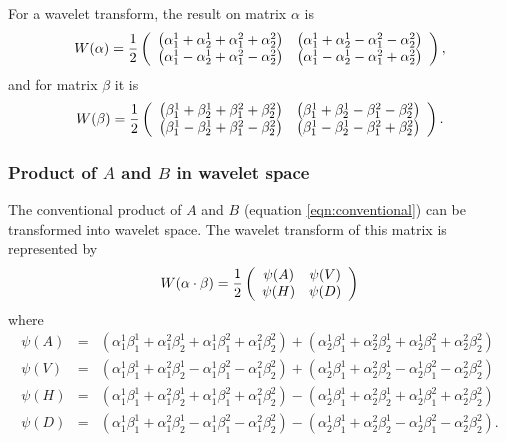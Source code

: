 For a wavelet transform, the result on matrix $\alpha$ is
\begin{equation} \label{WA} \displaystyle
W(\alpha) = 
{1 \over 2} 
\left(\begin{array}{cc}  
\left(\alpha^1_1 + \alpha^1_2 + \alpha^2_1 + \alpha^2_2\right) & 
\left(\alpha^1_1 + \alpha^1_2 - \alpha^2_1 - \alpha^2_2\right)  \\ 
\left(\alpha^1_1 - \alpha^1_2 + \alpha^2_1 - \alpha^2_2\right) & 
\left(\alpha^1_1 - \alpha^1_2 - \alpha^2_1 + \alpha^2_2\right)   
\end{array}\right), 
\end{equation}
and for matrix $\beta$ it is
\begin{equation} \label{WB} \displaystyle
W(\beta) = {1 \over 2} 
\left(\begin{array}{cc}
\left(\beta^1_1 + \beta^1_2 + \beta^2_1 + \beta^2_2\right) &
\left(\beta^1_1 + \beta^1_2 - \beta^2_1 - \beta^2_2\right) \\ 
\left(\beta^1_1 - \beta^1_2 + \beta^2_1 - \beta^2_2\right) &  
\left(\beta^1_1 - \beta^1_2 - \beta^2_1 + \beta^2_2\right)
\end{array}\right).
\end{equation}

\subsubsection{Product of $A$ and $B$ in wavelet space}

The conventional product of $A$ and $B$ (equation \ref{eqn:conventional}) can be transformed into wavelet space. The wavelet transform of this matrix is represented by 
\[
W(\alpha \cdot \beta) =
{1 \over 2}
\left(
\begin{array}{cc}
\psi(A) & \psi(V) \\
\psi(H) & \psi(D)
\end{array}
\right)
\]
where 
\begin{eqnarray}
\label{eqn:abwavelet1}
\psi(A) &=& (\alpha^1_1 \beta^1_1 + \alpha^2_1 \beta^1_2 + \alpha^1_1\beta^2_1 + \alpha^2_1  \beta^2_2) + (\alpha^1_2 \beta^1_1 + \alpha^2_2 \beta^1_2 + \alpha^1_2 \beta^2_1 + \alpha^2_2 \beta^2_2)\\
\label{eqn:abwavelet2}
\psi(V) &=&(\alpha^1_1 \beta^1_1 + \alpha^2_1 \beta^1_2  - \alpha^1_1\beta^2_1 - \alpha^2_1  \beta^2_2) +  (\alpha^1_2 \beta^1_1 + \alpha^2_2 \beta^1_2 - \alpha^1_2 \beta^2_1 - \alpha^2_2 \beta^2_2 ) \\
\label{eqn:abwavelet3}
\psi(H) &=& (\alpha^1_1 \beta^1_1 + \alpha^2_1 \beta^1_2 + \alpha^1_1\beta^2_1 + \alpha^2_1  \beta^2_2) - (\alpha^1_2 \beta^1_1 + \alpha^2_2 \beta^1_2 + \alpha^1_2 \beta^2_1 + \alpha^2_2 \beta^2_2)\\
\label{eqn:abwavelet4}
\psi(D) &=& (\alpha^1_1 \beta^1_1 + \alpha^2_1 \beta^1_2  - \alpha^1_1\beta^2_1 - \alpha^2_1  \beta^2_2) - (\alpha^1_2 \beta^1_1 + \alpha^2_2 \beta^1_2 - \alpha^1_2 \beta^2_1 - \alpha^2_2 \beta^2_2 ).
\end{eqnarray}

